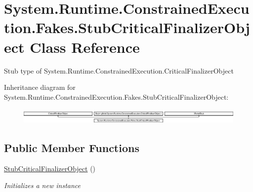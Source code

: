\hypertarget{class_system_1_1_runtime_1_1_constrained_execution_1_1_fakes_1_1_stub_critical_finalizer_object}{\section{System.\-Runtime.\-Constrained\-Execution.\-Fakes.\-Stub\-Critical\-Finalizer\-Object Class Reference}
\label{class_system_1_1_runtime_1_1_constrained_execution_1_1_fakes_1_1_stub_critical_finalizer_object}
}


Stub type of System.\-Runtime.\-Constrained\-Execution.\-Critical\-Finalizer\-Object 


Inheritance diagram for System.\-Runtime.\-Constrained\-Execution.\-Fakes.\-Stub\-Critical\-Finalizer\-Object\-:\begin{figure}[H]
\begin{center}
\leavevmode
\includegraphics[height=0.820513cm]{class_system_1_1_runtime_1_1_constrained_execution_1_1_fakes_1_1_stub_critical_finalizer_object}
\end{center}
\end{figure}
\subsection*{Public Member Functions}
\begin{DoxyCompactItemize}
\item 
\hyperlink{class_system_1_1_runtime_1_1_constrained_execution_1_1_fakes_1_1_stub_critical_finalizer_object_a57a03cd57c92e541f9a1a59dea4327de}{Stub\-Critical\-Finalizer\-Object} ()
\begin{DoxyCompactList}\small\item\em Initializes a new instance\end{DoxyCompactList}\end{DoxyCompactItemize}
